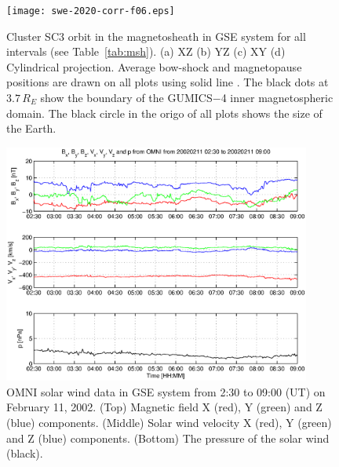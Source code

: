 \documentclass[linenumbers,draft]{agujournal}
\begin{document}
\pagebreak

\begin{figure}[h]
\centering
\texttt{[image: swe-2020-corr-f06.eps]}  
\caption{Cluster SC3 orbit in the magnetosheath in GSE system for all intervals (see Table~\ref{tab:msh}). (a) XZ (b) YZ (c) XY (d) Cylindrical projection. Average bow-shock and magnetopause positions are drawn on all plots using solid line \citep[][respectively]{peredo95:_three_alfven_mach,tsyganenko95:_model_earth}. The black dots at $3.7\,R_E$ show the boundary of the GUMICS$-$4 inner magnetospheric domain. The black circle in the origo of all plots shows the size of the Earth.}
\label{fig:mshorbit}
\end{figure}

\pagebreak

\begin{figure}[h]
\centering
\includegraphics[width=0.9\textwidth,angle=0]{swe-2020-corr-f07.eps}  
\caption{OMNI solar wind data in GSE system from 2:30 to 09:00 (UT) on February 11, 2002. (Top) Magnetic field X (red), Y (green) and Z (blue) components. (Middle) Solar wind velocity X (red), Y (green) and Z (blue) components. (Bottom) The pressure of the solar wind (black).}
\label{fig:mshomni}
\end{figure}

\pagebreak
\end{document}
